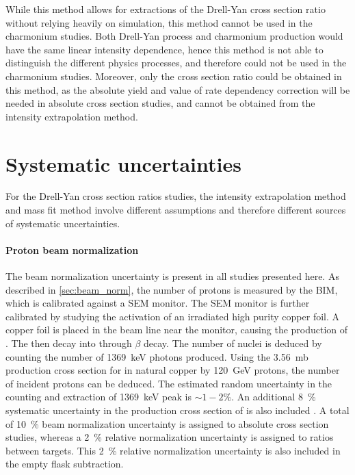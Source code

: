\documentclass[../main.tex]{subfiles}
\begin{document}

While this method allows for extractions of the Drell-Yan cross section ratio without relying
heavily on simulation, this method cannot be used in the charmonium studies.
Both Drell-Yan process and charmonium production would have the same linear intensity dependence,
hence this method is not able to distinguish the different physics processes, and therefore could
not be used in the charmonium studies. Moreover, only the cross section ratio could be obtained in
this method, as the absolute yield and value of rate dependency correction will be needed in
absolute cross section studies, and cannot be obtained from the intensity extrapolation method.

\section{Systematic uncertainties}
For the Drell-Yan cross section ratios studies, the intensity extrapolation method and mass fit
method involve different assumptions and therefore different sources of systematic uncertainties.
\paragraph{Proton beam normalization}
The beam normalization uncertainty is present in all studies presented here.
As described in \cref{sec:beam_norm}, the number of protons is measured by the BIM, which is
calibrated against a SEM monitor. The SEM monitor is further calibrated by studying the activation of
an irradiated high purity copper foil. A copper foil is placed in the beam line near the monitor,
causing the production of . The  then decay into  through $\beta$
decay. The number of   nuclei is deduced by counting the number of \SI{1369}{\keV} photons
produced. Using the \SI{3.56}{\milli\barn} production cross section for  in natural
copper  by \SI{120}{\GeV} protons, the number of incident protons can be deduced. The estimated
random uncertainty in the counting and extraction of \SI{1369}{\keV} peak is $\sim 1-2\%$.
An additional \SI{8}{\percent} systematic uncertainty in the production cross section of 
is also included \cite{docdb-457,docdb-7708}.
A total of \SI{10}{\percent} beam normalization uncertainty is assigned to absolute cross
section studies, whereas a \SI{2}{\percent} relative normalization uncertainty is assigned to ratios between
targets. This \SI{2}{\percent} relative normalization uncertainty is also included in the empty flask
subtraction.
\end{document}
